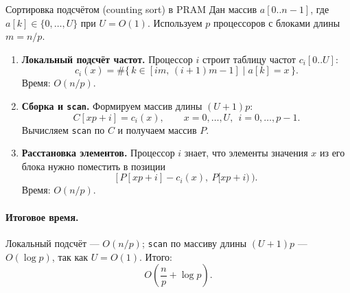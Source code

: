 \begin{Example}{Сортировка подсчётом (counting sort) в PRAM}{}
	Дан массив $a[0..n-1]$, где $a[k] \in \{0, \dots, U\}$ при $U = O(1)$. Используем $p$ процессоров с блоками длины $m = n/p$.
	
	\begin{enumerate}
		\item \textbf{Локальный подсчёт частот.} Процессор $i$ строит таблицу частот $c_i[0..U]$:
		\[
		c_i(x) = \#\{\, k \in [im,\, (i+1)m - 1] \mid a[k] = x \,\}.
		\]
		Время: $O(n/p)$.
		
		\item \textbf{Сборка и \texttt{scan}.} Формируем массив длины $(U+1)p$:
		\[
		C[xp + i] = c_i(x), \qquad x = 0, \dots, U,\ \ i = 0, \dots, p-1.
		\]
		Вычисляем \texttt{scan} по $C$ и получаем массив $P$.
		
		\item \textbf{Расстановка элементов.} Процессор $i$ знает, что элементы значения $x$ из его блока нужно поместить в позиции
		\[
		\bigl[\, P[xp + i] - c_i(x),\ P[xp + i) \,\bigr).
		\]
		Время: $O(n/p)$.
	\end{enumerate}
	
	\paragraph{Итоговое время.}
	Локальный подсчёт — $O(n/p)$; \texttt{scan} по массиву длины $(U+1)p$ — $O(\log p)$, так как $U = O(1)$. Итого:
	\[
	O\!\left(\frac{n}{p} + \log p\right).
	\]
\end{Example}